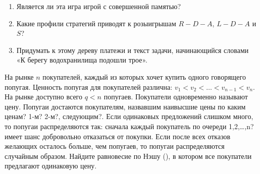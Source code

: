 \begin{problem}

\begin{enumerate}
\item Является ли эта игра игрой с совершенной памятью?\par
\item Какие профили стратегий приводят к розыигрышам  $R-D-A$,  $L-D-A$  и  $S$? \par
\item  Придумать к этому дереву платежи и текст задачи, начинающийся словами «К берегу водохранилища подошли трое».
\end{enumerate}


\begin{sol}

\end{sol}
\end{problem}



\begin{problem}
\begin{source} \cite{colell:mt} \end{source}
На рынке  $n$  покупателей, каждый из которых хочет купить одного говорящего попугая. Ценность попугая для покупателей различна:  $v_{1} <v_{2} <\ldots <v_{n-1} <v_{n} $. На рынке доступно всего  $q<n$  попугаев. Покупатели одновременно называют цену. Попугаи достаются покупателям, назвавшим наивысшие цены {\red по каким ценам? 1-м? 2-м?, следующим?}. Если одинаковых предложений слишком много, то попугаи распределяются так: сначала каждый покупатель {\red по очереди 1,2,\ldots,n?} имеет шанс добровольно отказаться от покупки. Если после всех отказов желающих осталось больше, чем попугаев, то попугаи распределяются случайным образом.
Найдите равновесие по Нэшу (), в котором все покупатели предлагают одинаковую цену.\par



\begin{sol}

\end{sol}
\end{problem}



